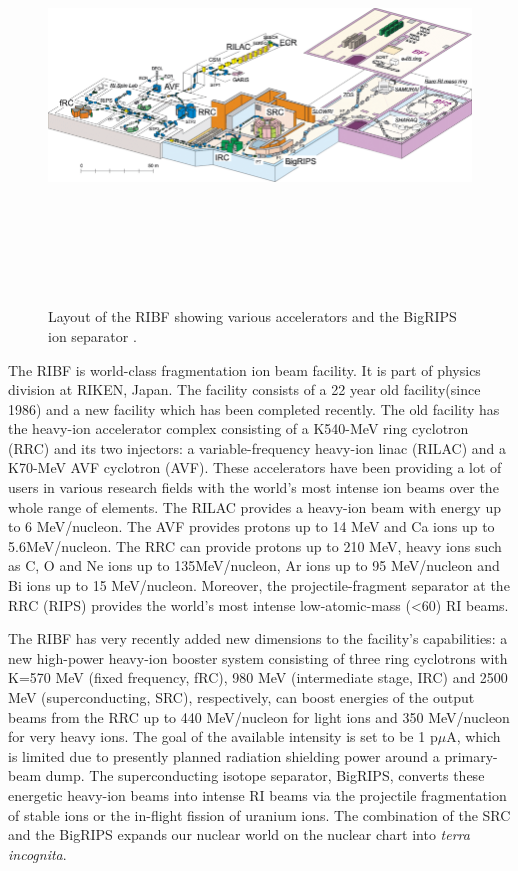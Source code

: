\documentclass[a4paper,12pt,twoside]{report}
\begin{document}
\begin{figure}[h!]
\centering
\includegraphics[width=15cm, height=11cm]{Layout-of-the-RIKEN-RI-Beam-Factory.png}
\caption[Layout of the RIBF showing various accelerators]{Layout of the RIBF showing various accelerators and the BigRIPS ion separator \cite{rikenasc}. }
\end{figure}
The RIBF is world-class fragmentation ion beam facility. It is part of physics division at RIKEN, Japan. The facility consists of a 22 year old facility(since 1986) and a new facility which has been completed recently. The old facility has the heavy-ion accelerator complex consisting of a K540-MeV ring cyclotron (RRC) and its two injectors: a variable-frequency heavy-ion linac (RILAC) and a K70-MeV AVF cyclotron (AVF). These accelerators have been providing a lot of users in various research fields with the world’s most intense ion beams over the whole range of elements. The RILAC provides a heavy-ion beam with energy up to 6 MeV/nucleon. The AVF provides protons up to 14 MeV and Ca ions up to 5.6MeV/nucleon. The RRC can provide protons up to 210 MeV, heavy ions such as C, O and Ne ions up to 135MeV/nucleon, Ar ions up to 95 MeV/nucleon and Bi ions up to 15 MeV/nucleon. Moreover, the projectile-fragment separator at the RRC (RIPS) provides the world's most intense low-atomic-mass (\textless 60) RI beams.

The RIBF has very recently added new dimensions to the facility's capabilities: a new high-power heavy-ion booster system consisting of three ring cyclotrons with K=570 MeV (fixed frequency, fRC), 980 MeV (intermediate stage, IRC) and 2500 MeV (superconducting, SRC), respectively, can boost energies of the output beams from the RRC up to 440 MeV/nucleon for light ions and 350 MeV/nucleon for very heavy ions. The goal of the available intensity is set to be 1 p$\mu$A, which is limited due to presently planned radiation shielding power around a primary-beam dump. The superconducting isotope separator, BigRIPS, converts these energetic heavy-ion beams into intense RI beams via the projectile fragmentation of stable ions or the in-flight fission of uranium ions. The combination of the SRC and the BigRIPS expands our nuclear world on the nuclear chart into \textit{terra incognita}. 
\end{document}
